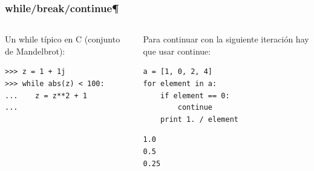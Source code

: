 \documentclass[10pt,colorlinks]{beamer}
\begin{document}
\begin{frame}[fragile]\frametitle{ while/break/continue¶}
\begin{columns}[T]

\begin{block}{Un while típico en C (conjunto de Mandelbrot):}
\tiny
\begin{verbatim}
>>> z = 1 + 1j
>>> while abs(z) < 100:
...    z = z**2 + 1
... 
\end{verbatim}

\end{block}

\begin{block}{Para continuar con la siguiente iteración hay que usar continue:}
\tiny
\begin{verbatim}
a = [1, 0, 2, 4]
for element in a:
    if element == 0:
        continue
    print 1. / element

\end{verbatim}
\begin{verbatim}
1.0
0.5
0.25
\end{verbatim}

\end{block}
\end{columns}
\end{frame}
\end{document}
